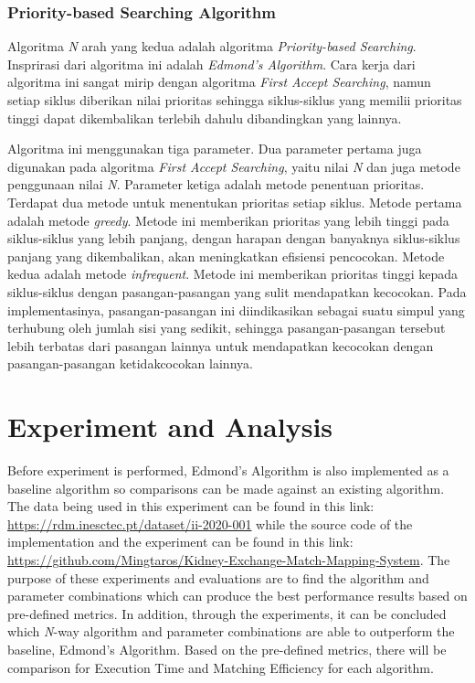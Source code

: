 \documentclass[conference]{IEEEtran}
\begin{document}
\subsubsection{Priority-based Searching Algorithm}
Algoritma \textit{N} arah yang kedua adalah algoritma \textit{Priority-based Searching}. Insprirasi dari algoritma ini adalah
\textit{Edmond's Algorithm}. Cara kerja dari algoritma ini sangat mirip dengan algoritma \textit{First Accept Searching}, namun
setiap siklus diberikan nilai prioritas sehingga siklus-siklus yang memilii prioritas tinggi dapat dikembalikan terlebih
dahulu dibandingkan yang lainnya. 

Algoritma ini menggunakan tiga parameter. Dua parameter pertama juga digunakan pada algoritma \textit{First Accept Searching},
yaitu nilai \textit{N} dan juga metode penggunaan nilai \textit{N}. Parameter ketiga adalah metode penentuan prioritas. Terdapat
dua metode untuk menentukan prioritas setiap siklus. Metode pertama adalah metode \textit{greedy}. Metode ini memberikan prioritas
yang lebih tinggi pada siklus-siklus yang lebih panjang, dengan harapan dengan banyaknya siklus-siklus panjang yang dikembalikan,
akan meningkatkan efisiensi pencocokan. Metode kedua adalah metode \textit{infrequent}. Metode ini memberikan prioritas tinggi
kepada siklus-siklus dengan pasangan-pasangan yang sulit mendapatkan kecocokan. Pada implementasinya, pasangan-pasangan ini diindikasikan
sebagai suatu simpul yang terhubung oleh jumlah sisi yang sedikit, sehingga pasangan-pasangan tersebut lebih terbatas dari pasangan
lainnya untuk mendapatkan kecocokan dengan pasangan-pasangan ketidakcocokan lainnya.

\section{Experiment and Analysis}
Before experiment is performed, Edmond's Algorithm is also implemented as a baseline algorithm so comparisons can be made against
an existing algorithm. The data being used in this experiment can be found in this link: \url{https://rdm.inesctec.pt/dataset/ii-2020-001}
while the source code of the implementation and the experiment can be found in this link: \url{https://github.com/Mingtaros/Kidney-Exchange-Match-Mapping-System}.
The purpose of these experiments and evaluations are to find the algorithm and parameter combinations which can produce the best
performance results based on pre-defined metrics. In addition, through the experiments, it can be concluded which \textit{N}-way
algorithm and parameter combinations are able to outperform the baseline, Edmond's Algorithm. Based on the pre-defined metrics,
there will be comparison for Execution Time and Matching Efficiency for each algorithm.
\end{document}
